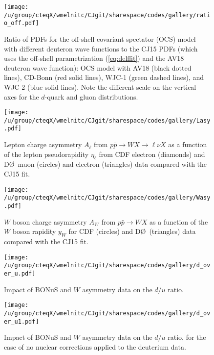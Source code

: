 \documentclass[aps,prd,amsmath,preprint]{revtex4}
\begin{document}
\begin{figure}[t]
\texttt{[image: /u/group/cteqX/wmelnitc/CJgit/sharespace/codes/gallery/ratio\_off.pdf]}
\caption{Ratio of PDFs for the off-shell covariant spectator (OCS)
	model with different deuteron wave functions to the CJ15 PDFs
	(which uses the off-shell parametrization (\ref{eq:delffit})
	and the AV18 deuteron wave function):
	OCS model with AV18 (black dotted lines),
	CD-Bonn (red solid lines),
	WJC-1 (green dashed lines), and
	WJC-2 (blue solid lines).
	Note the different scale on the vertical axes for the
	$d$-quark and gluon distributions.}
\label{fig:ratio_off}
\end{figure} 


\begin{figure}[t]
\texttt{[image: /u/group/cteqX/wmelnitc/CJgit/sharespace/codes/gallery/Lasy.pdf]}
\caption{Lepton charge asymmetry $A_{\ell}$ from
	$p\bar p \to W X \to \ell \nu X$ as a function of the
	lepton pseudorapidity $\eta_{\ell}$ from
	CDF electron (diamonds) \cite{CDF_e} and
	D\O\ muon (circles) \cite{D0_mu} and
	electron (triangles) \cite{D0_e} data
	compared with the CJ15 fit.}
\label{fig:Lasy}
\end{figure} 

  
\begin{figure}[t]
\texttt{[image: /u/group/cteqX/wmelnitc/CJgit/sharespace/codes/gallery/Wasy.pdf]}
\caption{$W$ boson charge asymmetry $A_W$ from $p\bar p \to W X$
	as a function of the $W$ boson rapidity $y_W$ for
	CDF (circles) \cite{CDF_W} and D\O\ (triangles) \cite{D0_W} data
	compared with the CJ15 fit.}
\label{fig:Wasy}
\end{figure} 




\begin{figure}[t]
\texttt{[image: /u/group/cteqX/wmelnitc/CJgit/sharespace/codes/gallery/d\_over\_u.pdf]}
\caption{Impact of BONuS \cite{BONuS} and $W$ asymmetry data
	on the $d/u$ ratio.}
\label{fig:du}
\end{figure} 


\begin{figure}[t]
\texttt{[image: /u/group/cteqX/wmelnitc/CJgit/sharespace/codes/gallery/d\_over\_u1.pdf]}
\caption{Impact of BONuS \cite{BONuS} and $W$ asymmetry data
	on the $d/u$ ratio, for the case of no nuclear corrections
	applied to the deuterium data.}
\label{fig:du1}
\end{figure} 
\end{document}
